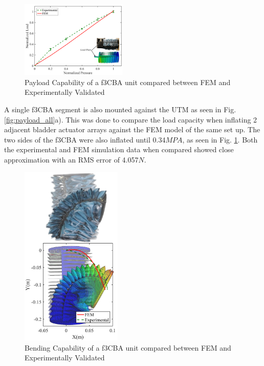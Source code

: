 \documentclass[letterpaper, 10 pt, conference]{ieeeconf}  %
\begin{document}
\begin{figure}[b!]
\centering
\includegraphics[width=0.45\textwidth]{Figures/3CA_instron}
\caption{Payload Capability of a f3CBA unit compared between FEM and Experimentally Validated}
\label{fig:f3CAs_load_fem_real}
\vspace{-1.5em}
\end{figure}

A single f3CBA segment is also mounted against the UTM as seen in Fig. \ref{fig:payload_all}a). This was done to compare the load capacity when inflating 2 adjacent bladder actuator arrays against the FEM model of the same set up. The two sides of the f3CBA were also inflated until 0.34$MPA$, as seen in Fig. \ref{fig:f3CAs_load_fem_real}. Both the experimental and FEM simulation data when compared showed close approximation with an RMS error of 4.057$N$. 

\begin{figure}[t!]
\centering
\includegraphics[width=0.43\textwidth]{Figures/3CA_bend_FEM_REAL_v2}
\caption{Bending Capability of a f3CBA unit compared between FEM and Experimentally Validated}
\label{fig:f3CAs_bend_fem_real}
\vspace{-1.5em}
\end{figure}
\end{document}
